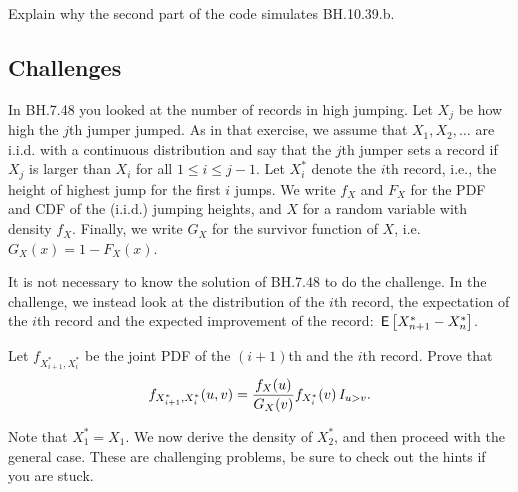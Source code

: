 \documentclass[assignments]{subfiles}
\begin{document}
\begin{exercise}
Explain why the second part of the code simulates BH.10.39.b.
\end{exercise}



\subsection{Challenges}

In BH.7.48 you looked at the number of records in high jumping.
Let $X_j$ be how high the $j$th jumper jumped.
As in that exercise, we assume that $X_1, X_2, \ldots$ are i.i.d.
with a continuous distribution and say that the $j$th jumper sets a record if $X_j$ is larger than $X_i$ for all $1\leq i \leq j-1$.
Let $X_i^*$ denote the $i$th record, i.e., the height of highest jump for the first $i$ jumps.
We write $f_X$ and $F_X$ for the PDF and CDF of the (i.i.d.)
jumping heights, and $X$ for a random variable with density $f_X$.
Finally, we write $G_X$ for the survivor function of $X$, i.e.
$G_X(x) = 1-F_X(x)$.

It is not necessary to know the solution of BH.7.48 to do the challenge. In the challenge, we instead look at the distribution of the $i$th record, the expectation of the $i$th record and the expected improvement of the record: $\,\mathsf{E}\left[X_{n+1}^* - X_n^*\right]$.


\begin{exercise}
Let $f_{X_{i+1}^*, X_i^*}$ be the joint PDF of the $(i+1)$th and the $i$th record.
Prove that $$f_{X_{i+1}^*, X_i^*}(u,v) = \frac{f_X(u)}{G_X(v)} f_{X_i^*}(v) \,I_{u >v}.$$

\end{exercise}

Note that $X_1^* = X_1$. We now derive the density of $X_2^*$, and then proceed with the general case. These are challenging problems, be sure to check out the hints if you are stuck.
\end{document}
